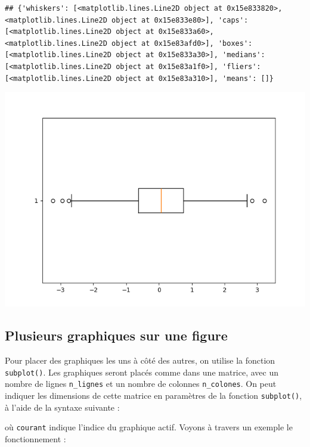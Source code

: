 \documentclass[
  12pt,
]{book}
\numberwithin{equation}{section}
\numberwithin{countremarque}{section}
\begin{document}
\begin{lstlisting}
## {'whiskers': [<matplotlib.lines.Line2D object at 0x15e833820>, <matplotlib.lines.Line2D object at 0x15e833e80>], 'caps': [<matplotlib.lines.Line2D object at 0x15e833a60>, <matplotlib.lines.Line2D object at 0x15e83afd0>], 'boxes': [<matplotlib.lines.Line2D object at 0x15e833a30>], 'medians': [<matplotlib.lines.Line2D object at 0x15e83a1f0>], 'fliers': [<matplotlib.lines.Line2D object at 0x15e83a310>], 'means': []}
\end{lstlisting}

\begin{center}\includegraphics[width=9.03in]{figs/pyplot/boxplot_horizontal} \end{center}

\subsection{Plusieurs graphiques sur une figure}\label{plusieurs-graphiques-sur-une-figure}

Pour placer des graphiques les uns à côté des autres, on utilise la fonction \texttt{subplot()}. Les graphiques seront placés comme dans une matrice, avec un nombre de lignes \texttt{n\_lignes} et un nombre de colonnes \texttt{n\_colones}. On peut indiquer les dimensions de cette matrice en paramètres de la fonction \texttt{subplot()}, à l'aide de la syntaxe suivante :

où \texttt{courant} indique l'indice du graphique actif. Voyons à travers un exemple le fonctionnement :
\end{document}
